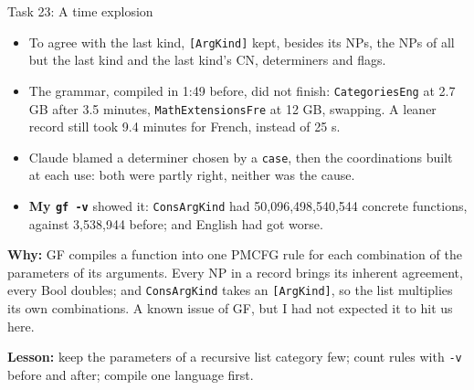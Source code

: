 \documentclass[10pt,aspectratio=169]{beamer}
\newcommand{\bad}[1]{\textcolor{warn}{#1}}
\begin{document}
\begin{frame}{Task 23: A time explosion}
  \begin{itemize}\small
    \item To agree with the last kind, \texttt{[ArgKind]} kept, besides its NPs, the
          NPs of all but the last kind and the last kind's CN, determiners and flags.
    \item The grammar, compiled in 1:49 before, did not finish:
          \texttt{CategoriesEng} at 2.7 GB after 3.5 minutes, \texttt{MathExtensionsFre}
          at 12 GB, swapping. A leaner record still took 9.4 minutes for French,
          instead of 25 s.
    \item Claude blamed a determiner chosen by a \texttt{case}, then the coordinations
          built at each use: both were partly right, neither was the cause.
    \item \textbf{My \texttt{gf -v}} showed it: \texttt{ConsArgKind} had
          \bad{50,096,498,540,544} concrete functions, against 3,538,944 before;
          and English had got worse.
  \end{itemize}
  \textbf{Why:} GF compiles a function into one PMCFG rule for each combination of
  the parameters of its arguments. Every NP in a record brings its inherent
  agreement, every Bool doubles; and \texttt{ConsArgKind} takes an
  \texttt{[ArgKind]}, so the list multiplies its own combinations. A known issue of
  GF, but I had not expected it to hit us here.

  \vspace{0.3em}
  \small\textbf{Lesson:} keep the parameters of a recursive list category few; count
  rules with \texttt{-v} before and after; compile one language first.
\end{frame}
\end{document}
